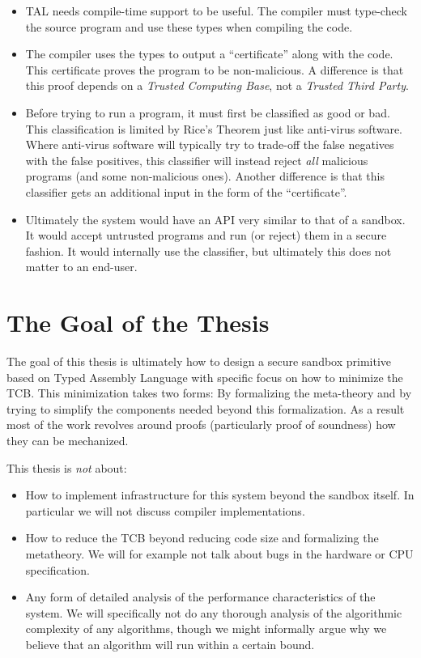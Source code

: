 \begin{itemize}
\item TAL needs compile-time support to be useful. The compiler must type-check
  the source program and use these types when compiling the code.

\item The compiler uses the types to output a ``certificate'' along with the
  code. This certificate proves the program to be non-malicious. A difference is
  that this proof depends on a \emph{Trusted Computing Base}, not a
  \emph{Trusted Third Party}.

\item Before trying to run a program, it must first be classified as good or
  bad. This classification is limited by Rice's Theorem just like anti-virus
  software. Where anti-virus software will typically try to trade-off the false
  negatives with the false positives, this classifier will instead reject
  \emph{all} malicious programs (and some non-malicious ones). Another
  difference is that this classifier gets an additional input in the form of the
  ``certificate''.

\item Ultimately the system would have an API very similar to that of a
  sandbox. It would accept untrusted programs and run (or reject) them in a
  secure fashion. It would internally use the classifier, but ultimately this
  does not matter to an end-user.
\end{itemize}

\section{The Goal of the Thesis}
\label{sec:goal}

The goal of this thesis is ultimately how to design a secure sandbox primitive
based on Typed Assembly Language with specific focus on how to minimize the
TCB. This minimization takes two forms: By formalizing the meta-theory and by
trying to simplify the components needed beyond this formalization. As a result
most of the work revolves around proofs (particularly proof of soundness) how
they can be mechanized.

This thesis is \emph{not} about:

\begin{itemize}
\item How to implement infrastructure for this system beyond the sandbox
  itself. In particular we will not discuss compiler implementations.
\item How to reduce the TCB beyond reducing code size and formalizing the
  metatheory. We will for example not talk about bugs in the hardware or CPU
  specification.
\item Any form of detailed analysis of the performance characteristics of the
  system.  We will specifically not do any thorough analysis of the algorithmic
  complexity of any algorithms, though we might informally argue why we believe
  that an algorithm will run within a certain bound.
\end{itemize}

